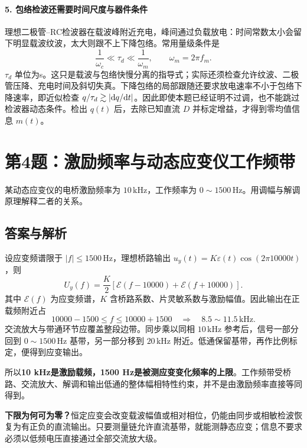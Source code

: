 \paragraph{5. 包络检波还需要时间尺度与器件条件}
理想二极管--RC检波器在载波峰附近充电，峰间通过负载放电：时间常数太小会留下明显载波纹波，太大则跟不上下降包络。常用量级条件是
\[
\frac1{\omega_c}\ll\tau_d\ll\frac1{\omega_m},
\qquad \omega_m=2\pi f_m.
\]
$\tau_d$ 单位为s。这只是载波与包络快慢分离的指导式；实际还须检查允许纹波、二极管压降、充电时间及斜切失真。下降包络的局部跟随还要求放电速率不小于包络下降速率，即近似检查
$q/\tau_d\gtrsim|\mathrm{d} q/\mathrm{d} t|$。因此即使本题已经证明不过调，也不能跳过检波器动态条件。检出 $q(t)$ 后，去除已知直流 $D$ 并标定增益，才得到零均值信息 $m(t)$。

\section{第4题：激励频率与动态应变仪工作频带}
\label{hw:5-4}

\begin{hwquestion}
某动态应变仪的电桥激励频率为 $10\,\mathrm{kHz}$，工作频率为 $0\sim1500\,\mathrm{Hz}$。用调幅与解调原理解释二者的关系。
\end{hwquestion}

\subsection*{答案与解析}
设应变频谱限于 $|f|\leq1500\,\mathrm{Hz}$，理想桥路输出 $u_y(t)=K\varepsilon(t)\cos(2\pi10000t)$，则
\[
U_y(f)=\frac K2[\mathcal E(f-10000)+\mathcal E(f+10000)].
\]
其中 $\mathcal E(f)$ 为应变频谱，$K$ 含桥路系数、片灵敏系数与激励幅值。因此输出在正载频附近占
\[
\boxed{10000-1500\leq f\leq10000+1500}
\quad\Longrightarrow\quad\boxed{8.5\sim11.5\,\mathrm{kHz}}.
\]
交流放大与带通环节应覆盖整段边带。同步乘以同相 $10\,\mathrm{kHz}$ 参考后，信号一部分回到 $0\sim1500\,\mathrm{Hz}$ 基带，另一部分移到 $20\,\mathrm{kHz}$ 附近。低通保留基带，再作比例标定，便得到应变输出。

所以\textbf{10 kHz是激励载频，1500 Hz是被测应变变化频率的上限}。工作频带受桥路、交流放大、解调和输出低通的整体幅相特性约束，并不是由激励频率直接等同得到。

\textbf{下限为何可为零？}恒定应变会改变载波幅值或相对相位，仍能由同步或相敏检波恢复为有正负的直流输出。只要测量链允许直流基带，就能测静态应变；信息不要求必须以低频电压直接通过全部交流放大级。

